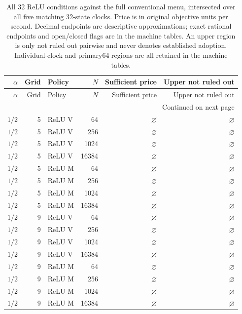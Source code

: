 \begingroup
\small\setlength{\tabcolsep}{3pt}
\begin{longtable}{rrlrrr}
\caption{All 32 ReLU conditions against the full conventional menu, intersected over all five matching 32-state clocks. Price is in original objective units per second. Decimal endpoints are descriptive approximations; exact rational endpoints and open/closed flags are in the machine tables. An upper region is only not ruled out pairwise and never denotes established adoption. Individual-clock and primary64 regions are all retained in the machine tables.}\label{tab:reluprices121}\\
\toprule
$\alpha$ & Grid & Policy & $N$ & Sufficient price & Upper not ruled out\\
\midrule\endfirsthead
\toprule
$\alpha$ & Grid & Policy & $N$ & Sufficient price & Upper not ruled out\\
\midrule\endhead
\midrule\multicolumn{6}{r}{Continued on next page}\\\endfoot
\bottomrule\endlastfoot
$1/2$ & 5 & ReLU V & 64 & $\varnothing$ & $\varnothing$\\
$1/2$ & 5 & ReLU V & 256 & $\varnothing$ & $\varnothing$\\
$1/2$ & 5 & ReLU V & 1024 & $\varnothing$ & $\varnothing$\\
$1/2$ & 5 & ReLU V & 16384 & $\varnothing$ & $\varnothing$\\
$1/2$ & 5 & ReLU M & 64 & $\varnothing$ & $\varnothing$\\
$1/2$ & 5 & ReLU M & 256 & $\varnothing$ & $\varnothing$\\
$1/2$ & 5 & ReLU M & 1024 & $\varnothing$ & $\varnothing$\\
$1/2$ & 5 & ReLU M & 16384 & $\varnothing$ & $\varnothing$\\
$1/2$ & 9 & ReLU V & 64 & $\varnothing$ & $\varnothing$\\
$1/2$ & 9 & ReLU V & 256 & $\varnothing$ & $\varnothing$\\
$1/2$ & 9 & ReLU V & 1024 & $\varnothing$ & $\varnothing$\\
$1/2$ & 9 & ReLU V & 16384 & $\varnothing$ & $\varnothing$\\
$1/2$ & 9 & ReLU M & 64 & $\varnothing$ & $\varnothing$\\
$1/2$ & 9 & ReLU M & 256 & $\varnothing$ & $\varnothing$\\
$1/2$ & 9 & ReLU M & 1024 & $\varnothing$ & $\varnothing$\\
$1/2$ & 9 & ReLU M & 16384 & $\varnothing$ & $\varnothing$\\

\end{longtable}
